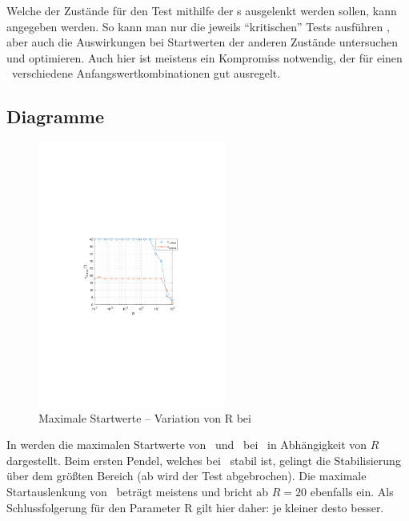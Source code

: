 Welche der Zustände für den Test mithilfe der \xots s ausgelenkt werden sollen, kann angegeben werden.
So kann man nur die jeweils "`kritischen"' Tests ausführen , aber auch die Auswirkungen bei Startwerten der anderen Zustände untersuchen und optimieren.
Auch hier ist meistens ein Kompromiss notwendig, der für einen \ap\ verschiedene Anfangswertkombinationen gut ausregelt.


\subsection{Diagramme}

\begin{figure}[tbp]
	\centering
		\includegraphics[width=0.55\textwidth]{Bilder/QRVariation/ap2/R phi12.pdf}
	\caption{Maximale Startwerte -- Variation von R bei \apz}
	\label{fig:qrap2R}
\end{figure}

In  werden die maximalen Startwerte von \phe\ und \phz\ bei \apz\ in Abhängigkeit von $R$ dargestellt.
Beim ersten Pendel, welches bei \apz\ stabil ist, gelingt die Stabilisierung über dem größten Bereich (ab  wird der Test abgebrochen).
Die maximale Startauslenkung von \phz\ beträgt meistens  und bricht ab $R=20$ ebenfalls ein.
Als Schlussfolgerung für den Parameter R gilt hier daher: je kleiner desto besser.

